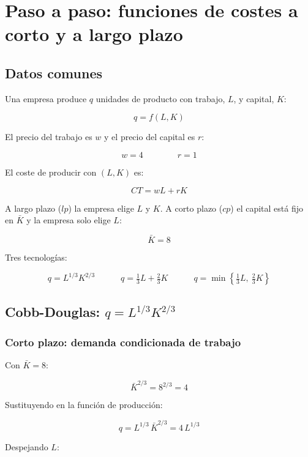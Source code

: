 \documentclass[
  11pt,
  a4paper,
]{report}
\begin{document}

\chapter{Paso a paso: funciones de costes a corto y a largo
plazo}\label{paso-a-paso-funciones-de-costes-a-corto-y-a-largo-plazo}

\section{Datos comunes}\label{datos-comunes}

Una empresa produce \(q\) unidades de producto con trabajo, \(L\), y
capital, \(K\):

\[q = f(L, K)\]

El precio del trabajo es \(w\) y el precio del capital es \(r\):

\[w = 4 \qquad\qquad r = 1\]

El coste de producir con \((L, K)\) es:

\[CT = wL + rK\]

A largo plazo (\(lp\)) la empresa elige \(L\) y \(K\). A corto plazo
(\(cp\)) el capital está fijo en \(\bar K\) y la empresa solo elige
\(L\):

\[\bar K = 8\]

Tres tecnologías:

\[q = L^{1/3}K^{2/3} \qquad\quad q = \tfrac13 L + \tfrac23 K \qquad\quad q = \min\left\{\tfrac13 L,\ \tfrac23 K\right\}\]

\section{\texorpdfstring{Cobb-Douglas:
\(q = L^{1/3}K^{2/3}\)}{Cobb-Douglas: q = L\^{}\{1/3\}K\^{}\{2/3\}}}\label{cobb-douglas-q-l13k23}

\subsection{Corto plazo: demanda condicionada de
trabajo}\label{corto-plazo-demanda-condicionada-de-trabajo}

Con \(\bar K = 8\):

\[\bar K^{2/3} = 8^{2/3} = 4\]

Sustituyendo en la función de producción:

\[q = L^{1/3}\,\bar K^{2/3} = 4\,L^{1/3}\]

Despejando \(L\):
\end{document}
